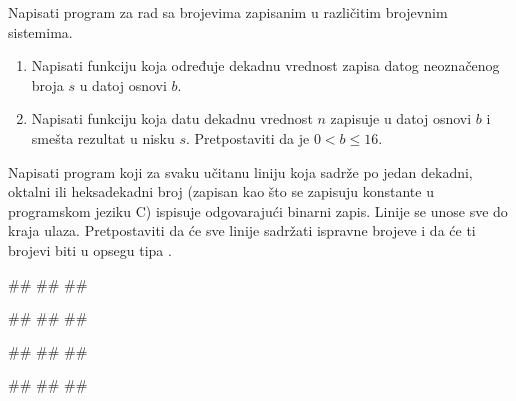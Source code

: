 \begin{Exercise}[label=p2.3_] 
Napisati program za rad sa brojevima zapisanim u različitim brojevnim sistemima.
\begin{enumerate}
\item Napisati funkciju  koja
određuje dekadnu vrednost zapisa datog neoznačenog broja $s$ u datoj
osnovi $b$. 
\item Napisati funkciju
 koja datu
dekadnu vrednost $n$ zapisuje u datoj osnovi $b$ i smešta
rezultat u nisku $s$. Pretpostaviti da je $0 < b \leq 16$.  
 \end{enumerate}
Napisati program koji za svaku učitanu liniju koja sadrže po jedan dekadni, oktalni ili
heksadekadni broj (zapisan kao što se zapisuju konstante u programskom
jeziku C) ispisuje odgovarajući binarni zapis. 
Linije se unose sve do kraja ulaza.
Pretpostaviti da će sve linije sadržati ispravne brojeve i da će ti brojevi biti u opsegu tipa
. 


\begin{miditest}
\begin{upotreba}{1}
#\naslovInt#
##
##
\end{upotreba}
\end{miditest}
\begin{miditest}
\begin{upotreba}{2}
#\naslovInt#
##
##
\end{upotreba}
\end{miditest}

\begin{miditest}
\begin{upotreba}{3}
#\naslovInt#
##
##
\end{upotreba}
\end{miditest}
\begin{miditest}
\begin{upotreba}{4}
#\naslovInt#
##
##
\end{upotreba}
\end{miditest}
\end{Exercise}
\begin{Answer}[ref=p2.3_]
\end{Answer}




